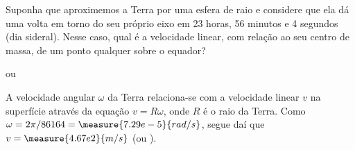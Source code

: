 \begin{question}
    Suponha que aproximemos a Terra por uma esfera de raio  e considere que ela dá uma volta em torno do seu próprio eixo em 23 horas, 56 minutos e 4 segundos (dia sideral).
    Nesse caso, qual é a velocidade linear, com relação ao seu centro de massa, de um ponto qualquer sobre o equador?

    \begin{answer}
       ou 
    \end{answer}

    \begin{solution}
      A velocidade angular $\omega$ da Terra relaciona-se com a velocidade linear $v$ na superfície através da equação $v = R\omega$, onde $R$ é o raio da Terra.
      Como $\omega = 2\pi/86164 = \measure{7.29e-5}{rad/s}$, segue daí que $v = \measure{4.67e2}{m/s}$ (ou ).
    \end{solution}
\end{question}